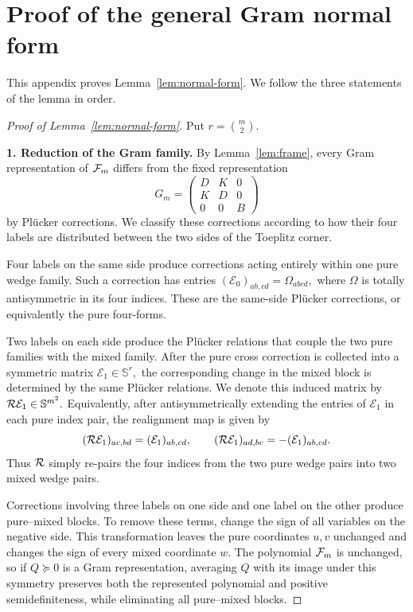 
\section{Proof of the general Gram normal form}
\label{app:normal-form-proof}

This appendix proves Lemma~\ref{lem:normal-form}.  We follow the three
statements of the lemma in order.

\begin{proof}[Proof of Lemma~\ref{lem:normal-form}]
Put $r=\binom m2$.

\medskip
\noindent
\textbf{1. Reduction of the Gram family.}
By Lemma~\ref{lem:frame}, every Gram representation of $\mathcal{F}_m$
differs from the fixed representation
\[
G_m=
\begin{pmatrix}
D&K&0\\
K&D&0\\
0&0&B
\end{pmatrix}
\]
by Pl\"ucker corrections.  We classify these corrections according to
how their four labels are distributed between the two sides of the
Toeplitz corner.

Four labels on the same side produce corrections acting entirely within
one pure wedge family.  Such a correction has entries
$
(\mathcal E_0)_{ab,cd}=\Omega_{abcd},
$
where $\Omega$ is totally antisymmetric in its four indices.  These are
the same-side Pl\"ucker corrections, or equivalently the pure
four-forms.

Two labels on each side produce the Pl\"ucker relations that couple the
two pure families with the mixed family.  After the pure cross
correction is collected into a symmetric matrix
$
\mathcal E_1\in\mathbb S^r,
$
the corresponding change in the mixed block is determined by the same
Pl\"ucker relations.  We denote this induced matrix by
$
\mathcal{R}\mathcal E_1\in\mathbb S^{m^2}.
$
Equivalently, after antisymmetrically extending the entries of
$\mathcal E_1$ in each pure index pair, the realignment map is given by
\[
 (\mathcal{R}\mathcal E_1)_{ac,bd}
 =(\mathcal E_1)_{ab,cd},
 \qquad
 (\mathcal{R}\mathcal E_1)_{ad,bc}
 =-(\mathcal E_1)_{ab,cd}.
\]
Thus $\mathcal{R}$ simply re-pairs the four indices from the two pure wedge
pairs into two mixed wedge pairs.

Corrections involving three labels on one side and one label on the
other produce pure--mixed blocks.  To remove these terms, change the
sign of all variables on the negative side.  This transformation leaves
the pure coordinates $u,v$ unchanged and changes the sign of every
mixed coordinate $w$.  The polynomial $\mathcal{F}_m$ is unchanged, so if
$Q\succeq0$ is a Gram representation, averaging $Q$ with its image
under this symmetry preserves both the represented polynomial and
positive semidefiniteness, while eliminating all pure--mixed blocks.


\end{proof}
